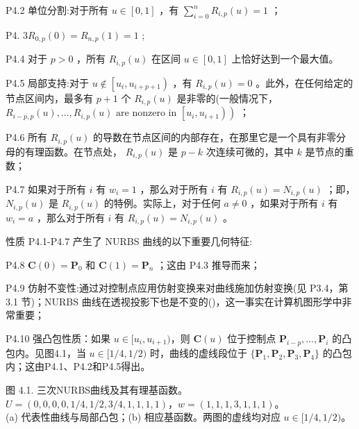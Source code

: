 \documentclass[../main.tex]{subfiles}
\begin{document}
P4.2 单位分割:对于所有 \(u \in  \left\lbrack  {0,1}\right\rbrack\) ，有 \(\mathop{\sum }\limits_{{i = 0}}^{n}{R}_{i,p}\left( u\right)  = 1\) ；

P4. \(3{R}_{0,p}\left( 0\right)  = {R}_{n,p}\left( 1\right)  = 1\) ;

P4.4 对于 \(p > 0\) ，所有 \({R}_{i,p}\left( u\right)\) 在区间 \(u \in  \left\lbrack  {0,1}\right\rbrack\) 上恰好达到一个最大值。

P4.5 局部支持:对于 \(u \notin  \left\lbrack  {{u}_{i},{u}_{i + p + 1}}\right)\) ，有 \({R}_{i,p}\left( u\right)  = 0\) 。此外，在任何给定的节点区间内，最多有 \(p + 1\) 个 \({R}_{i,p}\left( u\right)\) 是非零的(一般情况下， \(\left. {{R}_{i - p,p}\left( u\right) ,\ldots ,{R}_{i,p}\left( u\right) \text{ are nonzero in }\left\lbrack  {{u}_{i},{u}_{i + 1}}\right) }\right)\) ；

P4.6 所有 \({R}_{i,p}\left( u\right)\) 的导数在节点区间的内部存在，在那里它是一个具有非零分母的有理函数。在节点处， \({R}_{i,p}\left( u\right)\) 是 \(p - k\) 次连续可微的，其中 \(k\) 是节点的重数；

P4.7 如果对于所有 \(i\) 有 \({w}_{i} = 1\) ，那么对于所有 \(i\) 有 \({R}_{i,p}\left( u\right)  = {N}_{i,p}\left( u\right)\) ；即， \({N}_{i,p}\left( u\right)\) 是 \({R}_{i,p}\left( u\right)\) 的特例。实际上，对于任何 \(a \neq  0\) ，如果对于所有 \(i\) 有 \({w}_{i} = a\) ，那么对于所有 \(i\) 有 \({R}_{i,p}\left( u\right)  = {N}_{i,p}\left( u\right)\) 。

性质 P4.1-P4.7 产生了 NURBS 曲线的以下重要几何特征:

P4.8 \(\mathbf{C}\left( 0\right)  = {\mathbf{P}}_{0}\) 和 \(\mathbf{C}\left( 1\right)  = {\mathbf{P}}_{n}\) ；这由 P4.3 推导而来；

P4.9 仿射不变性:通过对控制点应用仿射变换来对曲线施加仿射变换(见 P3.4，第 3.1 节)；NURBS 曲线在透视投影下也是不变的(\cite{Lee87,Pieg91a})，这一事实在计算机图形学中非常重要；

P4.10 强凸包性质：如果 \(u\in[u_i,u_{i+1})\)，则 \(\mathbf C(u)\) 位于控制点 \(\mathbf P_{i-p},\ldots,\mathbf P_i\) 的凸包内。见图4.1，当 \(u\in[1/4,1/2)\) 时，曲线的虚线段位于 \(\{\mathbf P_1,\mathbf P_2,\mathbf P_3,\mathbf P_4\}\) 的凸包内；这由P4.1、P4.2和P4.5得出。

\begin{center}
\begin{minipage}{18cm}
\vspace*{.6\baselineskip}
\centering
{}
\par\smallskip
图 4.1. 三次NURBS曲线及其有理基函数。\\ \(U=(0,0,0,0,1/4,1/2,3/4,1,1,1,1)\)，\(w=(1,1,1,3,1,1,1)\)。\\ (a) 代表性曲线与局部凸包；(b) 相应基函数。两图的虚线均对应 \(u\in[1/4,1/2)\)。
\end{minipage}
\end{center}
\end{document}
